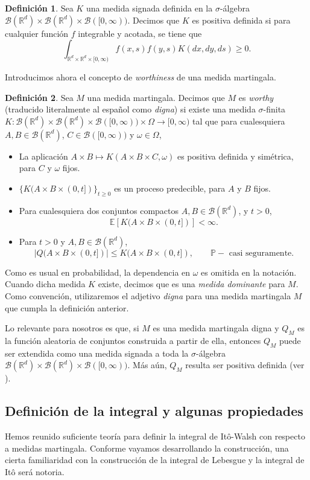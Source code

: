\documentclass[letterpaper,twoside,12pt]{book}
\newcommand{\R}{\mathbb{R}}
\newcommand{\B}{\mathcal{B}}
\newcommand{\E}{\mathbb{E}}
\renewcommand{\P}{\mathbb{P}}
\newcommand{\1}{\mathds{1}}
\newcommand{\abs}[1]{\left\lvert #1 \right\rvert}
\renewcommand{\to}{\rightarrow}
\theoremstyle{definition}
\newtheorem{dfn}{Definición}
\theoremstyle{definition}
\theoremstyle{remark}
\theoremstyle{definition}
\theoremstyle{definition}
\theoremstyle{definition}
\theoremstyle{definition}
\theoremstyle{definition}
\begin{document}
\begin{dfn} 
 Sea $K$ una medida signada definida en la $\sigma$-álgebra $\B(\R^{d})\times\B(\R^{d})\times\B([0,\infty))$. Decimos que $K$ es positiva definida si para cualquier función $f$ integrable y acotada, se tiene que 
 \[
 \int_{\R^{d}\times\R^{d}\times [0,\infty)} f(x,s)f(y,s)K(dx, dy, ds) \geq 0.
 \]
 \end{dfn}
 Introducimos ahora el concepto de \textit{worthiness} de una medida martingala.
\begin{dfn} 
Sea $M$ una medida martingala. Decimos que $M$ es \textit{worthy} (traducido literalmente al español como \textit{digna}) si existe una medida $\sigma$-finita $K:\B(\R^{d})\times \B(\R^{d})\times \B([0,\infty))\times \Omega \to [0, \infty)$ tal que para cualesquiera $A,B\in \B(\R^{d})$, $C\in \B([0,\infty))$ y $\omega \in \Omega$, 
\begin{itemize}
   \item La aplicación $A\times B\mapsto K(A\times B \times C,\omega)$ es positiva definida y simétrica, para $C$ y $\omega$ fijos.
   \item $\{K(A\times B \times (0,t])\}_{t\geq0}$ es un proceso predecible, para $A$ y $B$ fijos.
   \item Para cualesquiera dos conjuntos compactos $A,B \in \B(\R^{d})$, y $t>0$, 
   \[
   \E\left[K(A\times B \times (0,t])\right]<\infty.
   \]
   \item Para $t>0$ y $A,B\in \B(\R^{d})$, 
   \[
   \abs{Q(A\times B \times (0,t])}\leq K(A\times B \times (0,t]), \qquad \P-\text{ casi seguramente.}   
   \]
\end{itemize}
\end{dfn}
Como es usual en probabilidad, la dependencia en $\omega$ es omitida en la notación. Cuando dicha medida $K$ existe, decimos que es una \textit{medida dominante} para $M$. Como convención, utilizaremos el adjetivo \textit{digna} para una medida martingala $M$ que cumpla la definición anterior.

Lo relevante para nosotros es que, si $M$ es una medida martingala digna y $Q_M$ es la función aleatoria de conjuntos construida a partir de ella, entonces $Q_M$ puede ser extendida como una medida signada a toda la $\sigma$-álgebra $\B(\R^{d})\times\B(\R^{d})\times\B([0,\infty))$. Más aún, $Q_M$ resulta ser positiva definida (ver \cite[p. 291]{Walsh_J.B_Introduction_to_SPDEs}).  


\subsection{Definición de la integral y algunas propiedades}
Hemos reunido suficiente teoría para definir la integral de Itô-Walsh con respecto a medidas martingala. Conforme vayamos desarrollando la construcción, una cierta familiaridad con la construcción de la integral de Lebesgue y la integral de Itô será notoria. 
\end{document}
